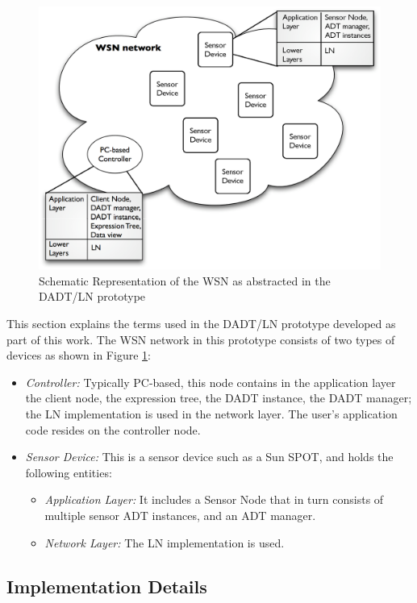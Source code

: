\begin{figure}
\centering
\includegraphics[scale=0.55]{img/DADTLN_glossary.eps} 
\caption[WSN in DADT/LN prototype]{Schematic Representation of the WSN as abstracted in the DADT/LN prototype}
\label{Fig:DADTLN_glossary}
\end{figure} 

This section explains the terms used in the DADT/LN prototype developed as part
of this work. The WSN network in this prototype consists of two types of
devices as shown in Figure \ref{Fig:DADTLN_glossary}: 
\begin{itemize}
  \item \emph{Controller:} Typically PC-based, this node contains in the
  application layer the client node, the expression tree, the DADT instance, the
  DADT manager; the LN
  implementation is used in the network layer. The user's application code resides on
  the controller node.
  \item \emph{Sensor Device:} This is a sensor device such as a Sun SPOT, and
  holds the following entities:
  \begin{itemize}
    \item \emph{Application Layer:} It includes a Sensor Node that in turn
    consists of multiple sensor ADT instances, and an ADT manager.
    \item \emph{Network Layer:} The LN implementation is used.
  \end{itemize}
\end{itemize}

\subsection{Implementation Details}


